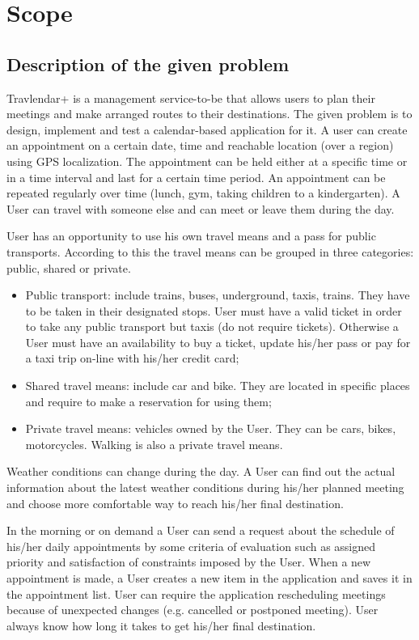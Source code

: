 \documentclass[a4paper,leqno]{book}
\begin{document}
\section{Scope}
\subsection{Description of the given problem}
Travlendar+ is a management service-to-be that allows users to plan their meetings and make  arranged routes to their destinations. The given problem is to design, implement and test a calendar-based application for it.
A user can create an appointment on a certain date, time and reachable location (over a region) using GPS localization. The appointment can be held either at a specific time or in a time interval and last for a certain time period. An appointment can be repeated regularly over time (lunch, gym, taking children to a kindergarten). A User can travel with someone else and can meet or leave them during the day.

User has an opportunity to use his own travel means and a pass for public transports. According to this the travel means can be grouped in three categories: public, shared or private.

\begin{itemize}
	\item Public transport: include trains, buses, underground, taxis, trains. They have to be taken in their designated stops. User must have a valid ticket in order to take any public transport but taxis (do not require tickets). Otherwise a User must have an availability to buy a ticket, update his/her pass or pay for a taxi trip on-line with his/her credit card;
	\item Shared travel means: include car and bike. They are located in specific places and require to make a reservation for using them;
	\item Private travel means: vehicles owned by the User. They can be cars, bikes, motorcycles. Walking is also a private travel means.
\end{itemize}

Weather conditions can change during the day. A User can find out the actual information about the latest weather conditions during his/her planned meeting and choose more comfortable way to reach his/her final destination.

In the morning or on demand a User can send a request about the schedule of his/her daily appointments by some criteria of evaluation such as assigned priority and satisfaction of constraints imposed by the User. When a new appointment is made, a User creates a new item in the application and saves it in the appointment list. User can require the application rescheduling meetings because of unexpected changes (e.g. cancelled or postponed meeting). User always know how long it takes to get his/her final destination. 
\end{document}

